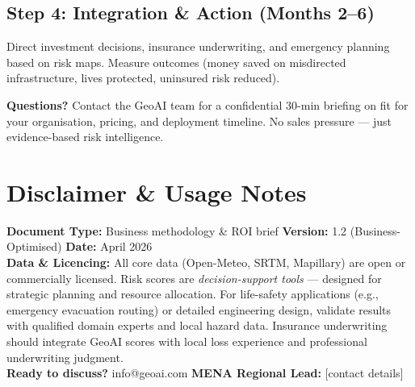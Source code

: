 \documentclass[11pt, a4paper]{article}
\begin{document}
\subsection*{Step 4: Integration \& Action (Months 2–6)}
\noindent
Direct investment decisions, insurance underwriting, and emergency planning based on risk maps. Measure outcomes
(money saved on misdirected infrastructure, lives protected, uninsured risk reduced).

\begin{infobox}
  \textbf{Questions?} Contact the GeoAI team for a confidential 30-min briefing on fit for your organisation,
  pricing, and deployment timeline. No sales pressure — just evidence-based risk intelligence.
\end{infobox}

\section*{Disclaimer \& Usage Notes}

\begin{tcolorbox}[
  enhanced, arc=6pt,
  colback=primary!5, colframe=primary!30,
  boxrule=0.6pt, left=10pt, right=10pt, top=8pt, bottom=8pt
]
  \small
  \textbf{Document Type:} Business methodology \& ROI brief \quad
  \textbf{Version:} 1.2 (Business-Optimised) \quad
  \textbf{Date:} April 2026 \\[6pt]
  \textbf{Data \& Licencing:} All core data (Open-Meteo, SRTM, Mapillary) are open or commercially licensed. 
  Risk scores are \textit{decision-support tools} — designed for strategic planning and resource allocation. 
  For life-safety applications (e.g., emergency evacuation routing) or detailed engineering design, validate results 
  with qualified domain experts and local hazard data. Insurance underwriting should integrate GeoAI scores with 
  local loss experience and professional underwriting judgment.
  \\[4pt]
  \textcolor{accentdark}{\textbf{Ready to discuss?}} info@geoai.com \quad \textbf{MENA Regional Lead:} [contact details]
\end{tcolorbox}
\end{document}
